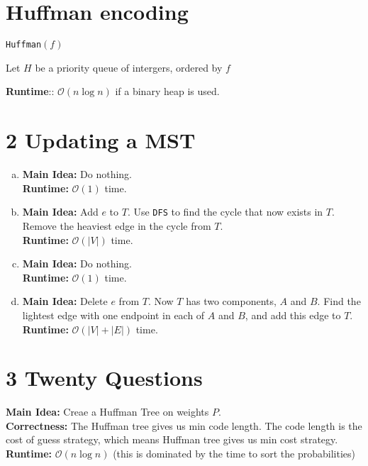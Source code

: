 \documentclass[11pt]{article}
\def\rt{\textbf{Runtime}:}
\newenvironment{qparts}{\begin{enumerate}[(a)]}{\end{enumerate}}
\begin{document}
	\section*{Huffman encoding}
	\begin{algorithm}[H]
		\caption{\texttt{Huffman}$(f)$}
		
		Let $H$ be a priority queue of intergers, ordered by $f$\\
	\end{algorithm}
	\rt: $\mathcal{O}(n \log n)$ if a binary heap is used.
	
	\section*{2 Updating a MST}
	\begin{qparts}
		\item \textbf{Main Idea: }Do nothing. \\
		\textbf{Runtime: }$\mathcal{O}(1)$ time.
		
		\item \textbf{Main Idea: }Add $e$ to $T$. Use \texttt{DFS} to find the cycle that now exists in $T$. Remove the heaviest edge in the cycle from $T$.\\
		\textbf{Runtime: }$\mathcal{O}(|V|)$ time.
		
		\item \textbf{Main Idea: }Do nothing. \\
		\textbf{Runtime: }$\mathcal{O}(1)$ time. 
		
		\item \textbf{Main Idea: } Delete $e$ from $T$. Now $T$ has two components, $A$ and $B$. Find the lightest edge with one endpoint in each of $A$ and $B$, and add this edge to $T$.\\
		\textbf{Runtime: }$\mathcal{O}(|V| + |E|)$ time.
		
	\end{qparts}
	
	\section*{3 Twenty Questions}
	\textbf{Main Idea: } Creae a Huffman Tree on weights $P$.\\
	\textbf{Correctness: } The Huffman tree gives us min code length. The code length is the cost of guess strategy, which means Huffman tree gives us min cost strategy.\\
	\textbf{Runtime: } $\mathcal{O}(n \log n)$ (this is dominated by the time to sort the probabilities)
	
\end{document}
